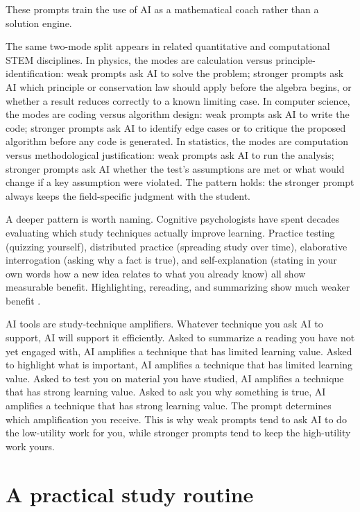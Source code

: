 \documentclass{SIAMbook2023}
\begin{document}
These prompts train the use of AI as a mathematical coach rather than a solution engine.

The same two-mode split appears in related quantitative and computational STEM disciplines. In physics, the modes are calculation versus principle-identification: weak prompts ask AI to solve the problem; stronger prompts ask AI which principle or conservation law should apply before the algebra begins, or whether a result reduces correctly to a known limiting case. In computer science, the modes are coding versus algorithm design: weak prompts ask AI to write the code; stronger prompts ask AI to identify edge cases or to critique the proposed algorithm before any code is generated. In statistics, the modes are computation versus methodological justification: weak prompts ask AI to run the analysis; stronger prompts ask AI whether the test's assumptions are met or what would change if a key assumption were violated. The pattern holds: the stronger prompt always keeps the field-specific judgment with the student.

A deeper pattern is worth naming. Cognitive psychologists have spent decades evaluating which study techniques actually improve learning. Practice testing (quizzing yourself), distributed practice (spreading study over time), elaborative interrogation (asking why a fact is true), and self-explanation (stating in your own words how a new idea relates to what you already know) all show measurable benefit. Highlighting, rereading, and summarizing show much weaker benefit \citep{dunlosky2013improving}.

AI tools are study-technique amplifiers. Whatever technique you ask AI to support, AI will support it efficiently. Asked to summarize a reading you have not yet engaged with, AI amplifies a technique that has limited learning value. Asked to highlight what is important, AI amplifies a technique that has limited learning value. Asked to test you on material you have studied, AI amplifies a technique that has strong learning value. Asked to ask you why something is true, AI amplifies a technique that has strong learning value. The prompt determines which amplification you receive. This is why weak prompts tend to ask AI to do the low-utility work for you, while stronger prompts tend to keep the high-utility work yours.

\section{A practical study routine}
\label{sec:study-routine}%
\end{document}
